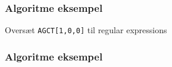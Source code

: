 \documentclass{beamer}
\begin{document}
\begin{frame}
	\frametitle{Algoritme eksempel}
	Oversæt \texttt{AGCT[1,0,0]} til regular expressions
\end{frame}

\begin{frame}
	\frametitle{Algoritme eksempel}

	
\end{frame}
\end{document}

